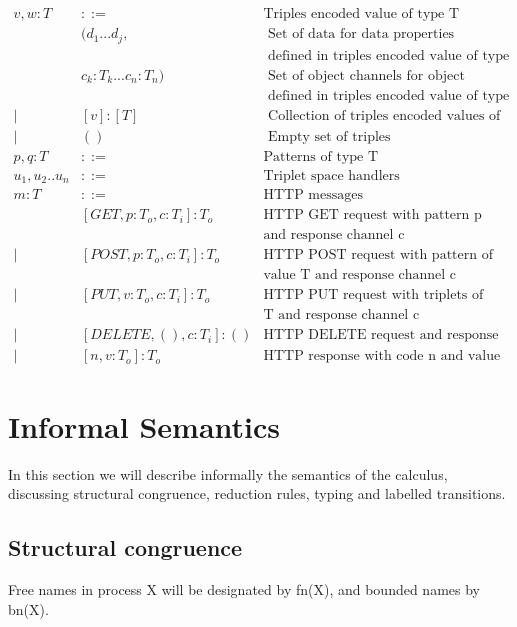 \begin{eqnarray*}
  v,w:T & ::=  & \mbox{Triples encoded value of type T} \\
      &  (d_1 ... d_j,  & \mbox{ Set of data for data properties} \\
      &    & \mbox{ defined in triples encoded value of type T} \\
      &  c_k:T_k ... c_n:T_n)  & \mbox{ Set of object channels for object properties} \\
      &    & \mbox{ defined in triples encoded value of type T} \\
    | & [v]:[T]  & \mbox{ Collection of triples encoded values of type T} \\
    | & ()  & \mbox{ Empty set of triples} \\
  p,q:T & ::= & \mbox{Patterns of type T} \\
  u_1,u_2 .. u_n & ::= & \mbox{Triplet space handlers} \\
 m:T & ::= & \mbox{HTTP messages} \\
      & [GET,p:T_o,c:T_i]:T_o& \mbox{HTTP GET request with pattern p}\\
      &                        &\mbox{and response channel c} \\
    | & [POST,p:T_o,c:T_i]:T_o& \mbox{HTTP POST request with pattern of} \\
      &                        &\mbox{value T and response channel c} \\
    | & [PUT,v:T_o,c:T_i]:T_o & \mbox{HTTP PUT request with triplets of value} \\
      &                       & \mbox{T and response channel c} \\
   | & [DELETE,(),c:T_i]:() & \mbox{HTTP DELETE request and response channel c} \\
    | & [n,v:T_o]:T_o & \mbox{HTTP response with code n and value T}
\end{eqnarray*}

\section{Informal Semantics}

In this section we will describe informally the semantics of the calculus, discussing structural congruence, reduction rules, typing and labelled transitions.

\subsection{Structural congruence}
Free names in process X will be designated by fn(X), and bounded names by bn(X).

